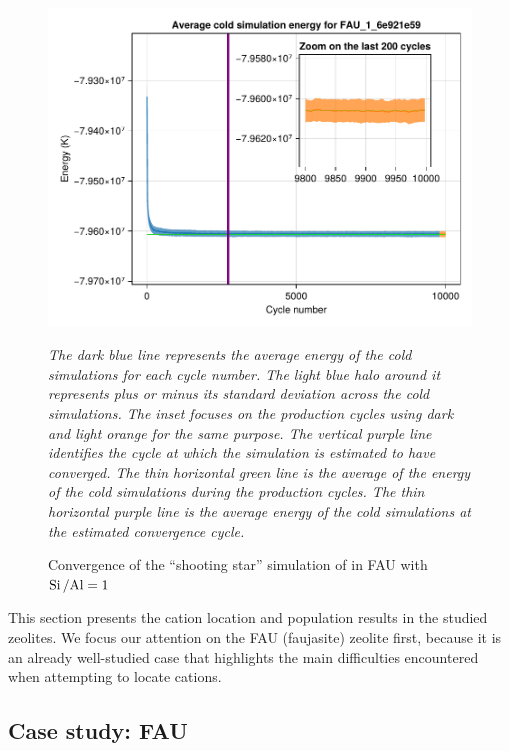 \documentclass[main.tex]{subfiles}
\begin{document}
\begin{figure}
	{\centering
	\includegraphics[width=\columnwidth]{figures/cations/convergenceFAUshootingstar.pdf}
	\caption{Convergence of the ``shooting star'' simulation of  in FAU with $\mbox{Si\,/Al} = 1$\\}\label{fig:convergenceFAUshootingstar}

	\sl The dark blue line represents the average energy of the cold simulations for each cycle number. The light blue halo around it represents plus or minus its standard deviation across the cold simulations. The inset focuses on the production cycles using dark and light orange for the same purpose. The vertical purple line identifies the cycle at which the simulation is estimated to have converged. The thin horizontal green line is the average of the energy of the cold simulations during the production cycles. The thin horizontal purple line is the average energy of the cold simulations at the estimated convergence cycle.}
\end{figure}

This section presents the cation location and population results in the studied zeolites. We focus our attention on the FAU (faujasite) zeolite first, because it is an already well-studied case that highlights the main difficulties encountered when attempting to locate cations.

\subsection{Case study: FAU}

\label{casestudyFAU}
\end{document}
